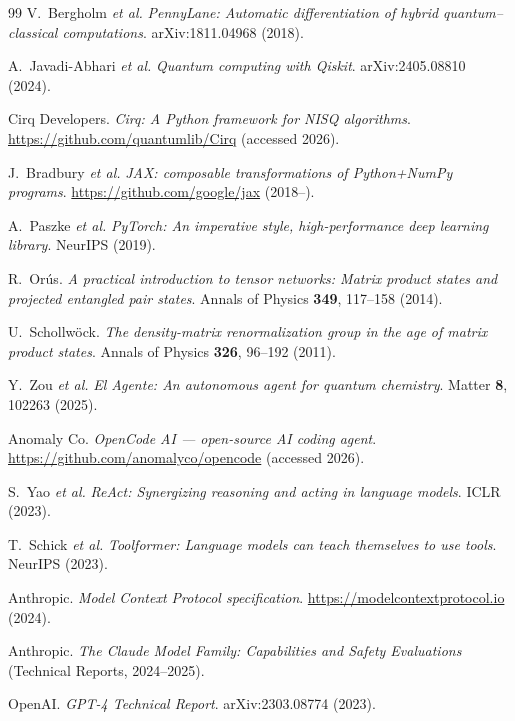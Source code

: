 \documentclass[11pt,a4paper]{article}
\begin{document}
\begin{thebibliography}{99}
  V.~Bergholm \textit{et al.}
  \textit{PennyLane: Automatic differentiation of hybrid quantum--classical
  computations}. arXiv:1811.04968 (2018).

  A.~Javadi-Abhari \textit{et al.}
  \textit{Quantum computing with Qiskit}. arXiv:2405.08810 (2024).

  Cirq Developers.
  \textit{Cirq: A Python framework for NISQ algorithms}.
  \url{https://github.com/quantumlib/Cirq} (accessed 2026).

  J.~Bradbury \textit{et al.}
  \textit{JAX: composable transformations of Python+NumPy programs}.
  \url{https://github.com/google/jax} (2018--).

  A.~Paszke \textit{et al.}
  \textit{PyTorch: An imperative style, high-performance deep learning library}.
  NeurIPS (2019).

  R.~Or\'us.
  \textit{A practical introduction to tensor networks: Matrix product states and
  projected entangled pair states}.
  Annals of Physics \textbf{349}, 117--158 (2014).

  U.~Schollw\"ock.
  \textit{The density-matrix renormalization group in the age of matrix product
  states}.
  Annals of Physics \textbf{326}, 96--192 (2011).

  Y.~Zou \textit{et al.}
  \textit{El Agente: An autonomous agent for quantum chemistry}.
  Matter \textbf{8}, 102263 (2025).

  Anomaly Co.
  \textit{OpenCode AI --- open-source AI coding agent}.
  \url{https://github.com/anomalyco/opencode} (accessed 2026).

  S.~Yao \textit{et al.}
  \textit{ReAct: Synergizing reasoning and acting in language models}. ICLR (2023).

  T.~Schick \textit{et al.}
  \textit{Toolformer: Language models can teach themselves to use tools}.
  NeurIPS (2023).

  Anthropic.
  \textit{Model Context Protocol specification}.
  \url{https://modelcontextprotocol.io} (2024).

  Anthropic.
  \textit{The Claude Model Family: Capabilities and Safety Evaluations}
  (Technical Reports, 2024--2025).

  OpenAI.
  \textit{GPT-4 Technical Report}. arXiv:2303.08774 (2023).


\end{thebibliography}
\end{document}
